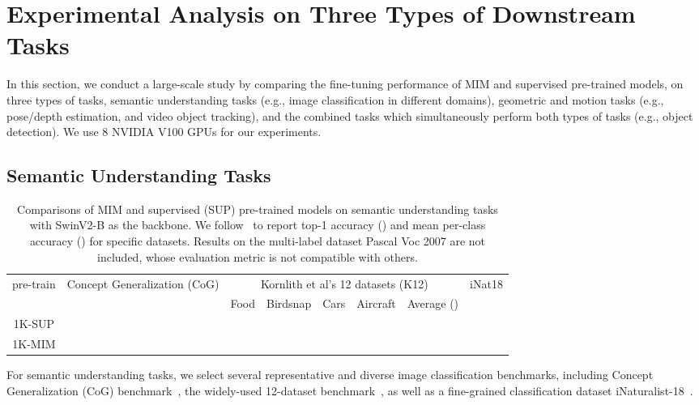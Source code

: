 \documentclass{article}
\begin{document}
\section{Experimental Analysis on Three Types of Downstream Tasks}\label{sec:exp}
\label{section:experiment}

In this section, we conduct a large-scale study by comparing the fine-tuning performance of MIM and supervised pre-trained models, on three types of tasks, semantic understanding tasks (e.g., image classification in different domains), geometric and motion tasks (e.g., pose/depth estimation, and video object tracking), and the combined tasks which simultaneously perform both types of tasks (e.g., object detection).
We use 8 NVIDIA V100 GPUs for our experiments.

\subsection{Semantic Understanding Tasks}

\renewcommand{\arraystretch}{1.15}
\begin{table}[t]
  \centering
  \addtolength{\tabcolsep}{-2.3pt}
  \begin{tabular}{c|ccccc|m{0.8cm}<{\centering}m{1.0cm}<{\centering}m{0.8cm}<{\centering}m{1.0cm}<{\centering}m{1.7cm}<{\centering}|m{0.9cm}<{\centering}}
    \bottomrule
    \multirow{2}{*}{pre-train}  & \multicolumn{5}{c|}{Concept Generalization (CoG)} & 
    \multicolumn{5}{c|}{Kornlith et al's 12 datasets (K12)}  & 
    \multirow{2}{*}{iNat18}\\
    \cline{2-11}
   &  &  &  &  &  & Food & Birdsnap & Cars & Aircraft & {Average ()} & \\
    \hline
    1K-SUP &  &   &  &  &  &  &  &  &  &  &  \\
1K-MIM &  &  &  &  &  &  &  &  &  &  &  \\
    \toprule
  \end{tabular}
  \caption{Comparisons of MIM and supervised (SUP) pre-trained models on semantic understanding tasks with SwinV2-B as the backbone. We follow~\cite{kornblith2019better} to report top-1 accuracy () and mean per-class accuracy () for specific datasets. Results on the multi-label dataset Pascal Voc 2007 are not included, whose evaluation metric is not compatible with others.
  }
  \label{tab-overall-zeroshot}
  \vspace{-1.0em}
\end{table}


For semantic understanding tasks, we select several representative and diverse image classification benchmarks, including Concept Generalization (CoG) benchmark~\cite{sariyildiz2021cog}, the widely-used 12-dataset benchmark~\cite{kornblith2019better}, as well as a fine-grained classification dataset iNaturalist-18~\cite{van2018inaturalist}. 
\end{document}
